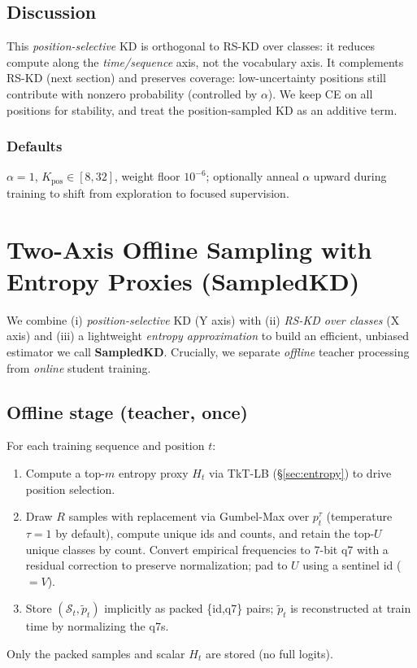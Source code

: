 \documentclass[11pt]{article}
\begin{document}
\subsection{Discussion}
This \emph{position-selective} KD is orthogonal to RS-KD over classes: it reduces compute along the \emph{time/sequence} axis, not the vocabulary axis. It complements RS-KD (next section) and preserves coverage: low-uncertainty positions still contribute with nonzero probability (controlled by $\alpha$).
We keep CE on all positions for stability, and treat the position-sampled KD as an additive term.

\subsubsection{Defaults}
$\alpha{=}1$, $K_{\text{pos}}\!\in\![8,32]$, weight floor $10^{-6}$; optionally anneal $\alpha$ upward during training to shift from exploration to focused supervision.


\section{Two-Axis Offline Sampling with Entropy Proxies (SampledKD)}
\label{sec:twoaxis}

We combine (i) \emph{position-selective} KD (Y axis) with (ii) \emph{RS-KD over classes} (X axis) and (iii) a lightweight \emph{entropy approximation} to build an efficient, unbiased estimator we call \textbf{SampledKD}.
Crucially, we separate \emph{offline} teacher processing from \emph{online} student training.

\subsection{Offline stage (teacher, once)}
For each training sequence and position $t$:
\begin{enumerate}
	\item Compute a top-$m$ entropy proxy $H_t$ via TkT-LB (\S\ref{sec:entropy}) to drive position selection.
	\item Draw $R$ samples with replacement via Gumbel-Max over $p_t^\tau$ (temperature $\tau{=}1$ by default), compute unique ids and counts, and retain the top-$U$ unique classes by count. Convert empirical frequencies to 7-bit q7 with a residual correction to preserve normalization; pad to $U$ using a sentinel id ($=V$).
	\item Store $(\mathcal{S}_t,\tilde p_t)$ implicitly as packed \{id,q7\} pairs; $\tilde p_t$ is reconstructed at train time by normalizing the q7s.
\end{enumerate}
Only the packed samples and scalar $H_t$ are stored (no full logits).
\end{document}
